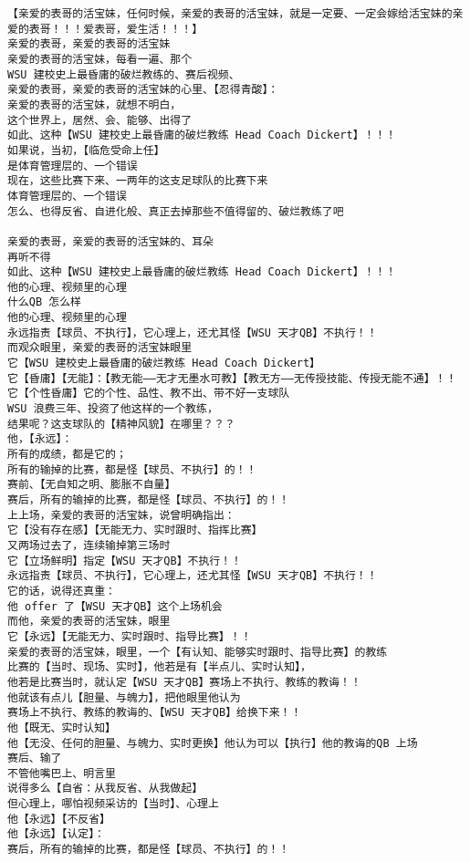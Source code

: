 \documentclass[9pt, b5paper]{article}
\begin{document}
\begin{verbatim}
【亲爱的表哥的活宝妹，任何时候，亲爱的表哥的活宝妹，就是一定要、一定会嫁给活宝妹的亲爱的表哥！！！爱表哥，爱生活！！！】
亲爱的表哥，亲爱的表哥的活宝妹
亲爱的表哥的活宝妹，每看一遍、那个
WSU 建校史上最昏庸的破烂教练的、赛后视频、
亲爱的表哥，亲爱的表哥的活宝妹的心里、【忍得青酸】：
亲爱的表哥的活宝妹，就想不明白，
这个世界上，居然、会、能够、出得了
如此、这种【WSU 建校史上最昏庸的破烂教练 Head Coach Dickert】！！！
如果说，当初，【临危受命上任】
是体育管理层的、一个错误
现在，这些比赛下来、一两年的这支足球队的比赛下来
体育管理层的、一个错误
怎么、也得反省、自进化般、真正去掉那些不值得留的、破烂教练了吧

亲爱的表哥，亲爱的表哥的活宝妹的、耳朵
再听不得
如此、这种【WSU 建校史上最昏庸的破烂教练 Head Coach Dickert】！！！
他的心理、视频里的心理
什么QB 怎么样
他的心理、视频里的心理
永远指责【球员、不执行】，它心理上，还尤其怪【WSU 天才QB】不执行！！
而观众眼里，亲爱的表哥的活宝妹眼里
它【WSU 建校史上最昏庸的破烂教练 Head Coach Dickert】
它【昏庸】【无能】：【教无能——无才无墨水可教】【教无方——无传授技能、传授无能不通】！！
它【个性昏庸】它的个性、品性、教不出、带不好一支球队
WSU 浪费三年、投资了他这样的一个教练，
结果呢？这支球队的【精神风貌】在哪里？？？
他，【永远】：
所有的成绩，都是它的；
所有的输掉的比赛，都是怪【球员、不执行】的！！
赛前、【无自知之明、膨胀不自量】
赛后，所有的输掉的比赛，都是怪【球员、不执行】的！！
上上场，亲爱的表哥的活宝妹，说曾明确指出：
它【没有存在感】【无能无力、实时跟时、指挥比赛】
又两场过去了，连续输掉第三场时
它【立场鲜明】指定【WSU 天才QB】不执行！！
永远指责【球员、不执行】，它心理上，还尤其怪【WSU 天才QB】不执行！！
它的话，说得还真重：
他 offer 了【WSU 天才QB】这个上场机会
而他，亲爱的表哥的活宝妹，眼里
它【永远】【无能无力、实时跟时、指导比赛】！！
亲爱的表哥的活宝妹，眼里，一个【有认知、能够实时跟时、指导比赛】的教练
比赛的【当时、现场、实时】，他若是有【半点儿、实时认知】，
他若是比赛当时，就认定【WSU 天才QB】赛场上不执行、教练的教诲！！
他就该有点儿【胆量、与魄力】，把他眼里他认为
赛场上不执行、教练的教诲的、【WSU 天才QB】给换下来！！
他【既无、实时认知】
他【无没、任何的胆量、与魄力、实时更换】他认为可以【执行】他的教诲的QB 上场
赛后、输了
不管他嘴巴上、明言里
说得多么【自省：从我反省、从我做起】
但心理上，哪怕视频采访的【当时】、心理上
他【永远】【不反省】
他【永远】【认定】：
赛后，所有的输掉的比赛，都是怪【球员、不执行】的！！


\end{verbatim}
\end{document}
